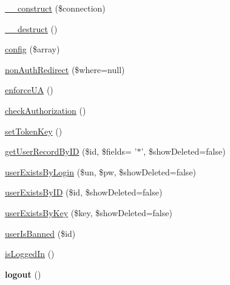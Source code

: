 \begin{DoxyCompactItemize}
\item 
\hyperlink{classauth_a155afedbdfa01f1c0b813ca97642cdab}{\-\_\-\-\_\-construct} (\$connection)
\item 
\hyperlink{classauth_a421831a265621325e1fdd19aace0c758}{\-\_\-\-\_\-destruct} ()
\item 
\hyperlink{classauth_a057f051ca656f78a79ca981dacebc88e}{config} (\$array)
\item 
\hyperlink{classauth_abefcaaea9deeedca260806646f382650}{non\-Auth\-Redirect} (\$where=null)
\item 
\hyperlink{classauth_ade192e4edd6743dadc62568b3c3b327b}{enforce\-U\-A} ()
\item 
\hyperlink{classauth_a4cffe19c1fe9a685eb6ad5b68af3d1de}{check\-Authorization} ()
\item 
\hyperlink{classauth_a139e1cf575e5e172ed7acf2cd46980a0}{set\-Token\-Key} ()
\item 
\hyperlink{classauth_a7e8d84a35b081d65271e0d428e36ef77}{get\-User\-Record\-By\-I\-D} (\$id, \$fields= '$\ast$', \$show\-Deleted=false)
\item 
\hyperlink{classauth_aa3f0ae9f886b6ef02ae06d035830ee01}{user\-Exists\-By\-Login} (\$un, \$pw, \$show\-Deleted=false)
\item 
\hyperlink{classauth_a93442c1443d04d0366326b3903857eb2}{user\-Exists\-By\-I\-D} (\$id, \$show\-Deleted=false)
\item 
\hyperlink{classauth_ae954498fbd4e427531d238a83a74eeb0}{user\-Exists\-By\-Key} (\$key, \$show\-Deleted=false)
\item 
\hyperlink{classauth_acb1c0f779213ec93f3853170a8bfb132}{user\-Is\-Banned} (\$id)
\item 
\hyperlink{classauth_a33bdd79e5da367ebddd4cfbdbbfc7cff}{is\-Logged\-In} ()
\item 
\hypertarget{classauth_a082405d89acd6835c3a7c7a08a7adbab}{{\bfseries logout} ()}\label{classauth_a082405d89acd6835c3a7c7a08a7adbab}


\end{DoxyCompactItemize}
